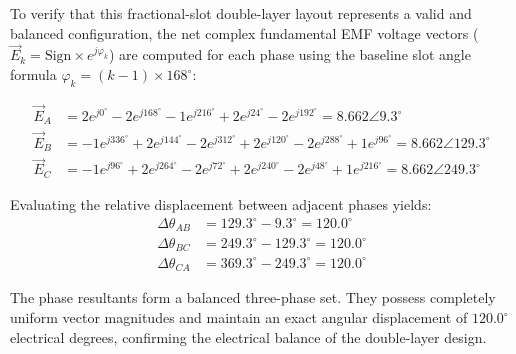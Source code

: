 \documentclass[12pt, a4paper]{article}
\begin{document}
\begin{table}[h!]
\centering
\caption{Double-layer concentrated winding slot assignment mapping for all phases.}
\label{tab:winding_layout_double}
\end{table}


To verify that this fractional-slot double-layer layout represents a valid and balanced configuration, the net complex fundamental EMF voltage vectors ($\vec{E}_k = \text{Sign} \times e^{j \varphi_k}$) are computed for each phase using the baseline slot angle formula $\varphi_k = (k-1) \times 168^\circ$:

\begin{align*}
    \vec{E}_A &= 2e^{j0^\circ} - 2e^{j168^\circ} - 1e^{j216^\circ} + 2e^{j24^\circ} - 2e^{j192^\circ} = \mathbf{8.662 \angle 9.3^\circ} \\
    \vec{E}_B &= -1e^{j336^\circ} + 2e^{j144^\circ} - 2e^{j312^\circ} + 2e^{j120^\circ} - 2e^{j288^\circ} + 1e^{j96^\circ} = \mathbf{8.662 \angle 129.3^\circ} \\
    \vec{E}_C &= -1e^{j96^\circ} + 2e^{j264^\circ} - 2e^{j72^\circ} + 2e^{j240^\circ} - 2e^{j48^\circ} + 1e^{j216^\circ} = \mathbf{8.662 \angle 249.3^\circ}
\end{align*}

Evaluating the relative displacement between adjacent phases yields:
\begin{align*}
    \Delta\theta_{AB} &= 129.3^\circ - 9.3^\circ = 120.0^\circ \\
    \Delta\theta_{BC} &= 249.3^\circ - 129.3^\circ = 120.0^\circ \\
    \Delta\theta_{CA} &= 369.3^\circ - 249.3^\circ = 120.0^\circ
\end{align*}

The phase resultants form a balanced three-phase set. They possess completely uniform vector magnitudes and maintain an exact angular displacement of $120.0^\circ$ electrical degrees, confirming the electrical balance of the double-layer design.
\end{document}
